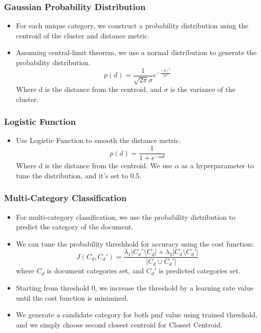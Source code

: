 \documentclass[
    10pt %
    16:9, %
]{beamer}
\begin{document}
\begin{frame}
  \frametitle{Gaussian Probability Distribution}
  \begin{itemize}
    \item For each unique category, we construct a probability distribution using the centroid of the cluster and distance metric.
    \item Assuming central-limit theorem, we use a normal distribution to generate the probability distribution.
    \[
      p(d) = \frac{1}{\sqrt{2\pi}\sigma}e^{-\frac{(d)^2}{2\sigma^2}}
    \]
    Where d is the distance from the centroid, and \(\sigma\) is the variance of the cluster.
  \end{itemize}
\end{frame}

\begin{frame}
  \frametitle{Logistic Function}
  \begin{itemize}
    \item Use Logistic Function to smooth the distance metric.
    \[
      p(d) = \frac{1}{1+e^{-\alpha d}}
    \]
    Where d is the distance from the centroid. We use $\alpha$ as a hyperparameter to tune the distribution, and it's set to 0.5.
  \end{itemize}
\end{frame}

\begin{frame}
  \frametitle{Multi-Category Classification}
  \begin{itemize}
    \item For multi-category classification, we use the probability distribution to predict the category of the document.
    \item We can tune the probability threshhold for accuracy using the cost function:
    \[
      J(C_d, C_d') = \frac{\lambda_1|C_d'\setminus C_d| + \lambda_2|C_d\setminus C_d'|}{|C_d\cup C_d'|}
    \]
    where $C_d$ is document categories set, and $C_d'$ is predicted categories set.
    \item Starting from threshold 0, we increase the threshold by a learning rate value until the cost function is minimized.
    \item We generate a candidate category for both pmf value using trained threshold, and we simply choose second closest centroid for Closest Centroid.
  \end{itemize}
\end{frame}
\end{document}
